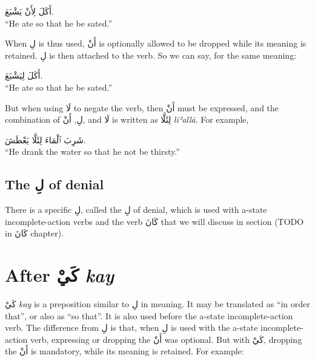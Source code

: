 \documentclass[
  10pt,
]{book}
\begin{document}
\foreignlanguage{arabic}{أَکَلَ لِأَنْ يَشْبَعَ.}\\
\enquote{He ate so that he be sated.}

When \foreignlanguage{arabic}{لِ} is thus used, \foreignlanguage{arabic}{أَنْ} is optionally allowed to be dropped while its meaning is retained.
\foreignlanguage{arabic}{لِ} is then attached to the verb.
So we can say, for the same meaning:

\foreignlanguage{arabic}{أَکَلَ لِيَشْبَعَ.}\\
\enquote{He ate so that he be sated.}

But when using \foreignlanguage{arabic}{لَا} to negate the verb, then \foreignlanguage{arabic}{أَنْ} must be expressed, and the combination of \foreignlanguage{arabic}{لِ}, \foreignlanguage{arabic}{أَنْ}, and \foreignlanguage{arabic}{لَا} is written as \foreignlanguage{arabic}{لِئَلَّا} \emph{liʾallā}. For example,

\foreignlanguage{arabic}{شَرِبَ ٱلْمَاءَ لِئَلَّا يَعْطَشَ.}\\
\enquote{He drank the water so that he not be thirsty.}

\subsection{\texorpdfstring{The \foreignlanguage{arabic}{لِ} of denial}{The لِ of denial}}\label{the-ux644-of-denial}

There is a specific \foreignlanguage{arabic}{لِ}, called the \foreignlanguage{arabic}{لِ} of denial, which is used with a-state incomplete-action verbs and the verb \foreignlanguage{arabic}{کَانَ} that we will discuss in section (TODO in \foreignlanguage{arabic}{کَانَ} chapter).

\section{\texorpdfstring{After \foreignlanguage{arabic}{کَيْ} \emph{kay}}{After کَيْ kay}}\label{after-ux643ux64a-kay}

\foreignlanguage{arabic}{کَيْ} \emph{kay}
is a preposition similar to \foreignlanguage{arabic}{لِ} in meaning. It may be translated as \enquote{in order that}, or also as \enquote{so that}.
It is also used before the a-state incomplete-action verb.
The difference from \foreignlanguage{arabic}{لِ} is that, when \foreignlanguage{arabic}{لِ} is used with the a-state incomplete-action verb, expressing or dropping the \foreignlanguage{arabic}{أَنْ} was optional.
But with \foreignlanguage{arabic}{کَيْ}, dropping the \foreignlanguage{arabic}{أَنْ} is mandatory, while its meaning is retained. For example:
\end{document}
